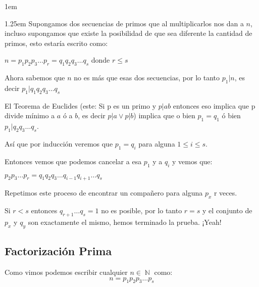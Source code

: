 \documentclass[12pt, fleqn]{report}                             %
\newenvironment{Indentation}[1][0.75em]                         %
    {\begin{adjustwidth}{#1}{}}                                     %
    {\end{adjustwidth}}                                             %
\newenvironment{SmallIndentation}[1][0.75em]                    %
    {\begin{adjustwidth}{#1}{}\begin{footnotesize}}                 %
    {\end{footnotesize}\end{adjustwidth}}                           %
\DeclareMathOperator \Naturals  {\mathbb{N}}                     %
\begin{document}
\begin{SmallIndentation}[1em]
            \begin{Indentation}[1.25em]
                Supongamos dos secuencias de primos que al multiplicarlos nos dan
                a $n$, incluso supongamos que existe la posibilidad de que sea
                diferente la cantidad de primos, esto estaría escrito como:

                $n=p_1p_2p_3\dots p_r = q_1q_2q_3\dots q_s$ donde $r \leq s$

                Ahora sabemos que $n$ no es más que esas dos secuencias, por 
                lo tanto $p_1|n$, es decir $p_1|q_1q_2q_3\dots q_s$

                El Teorema de Euclides (este: Si p es un primo y $p|ab$ entonces
                eso implica que p divide mínimo a $a$ ó a $b$, es decir
                $p|a \lor p|b$) implica que o bien $p_1=q_1$ ó bien
                $p_1|q_2q_3\dots q_s$.

                Así que por inducción veremos que $p_1=q_i$ para alguna
                $1 \leq i \leq s$.

                Entonces vemos que podemos cancelar a esa $p_1$ y a $q_i$ y vemos
                que:

                $p_2p_3\dots p_r = q_1q_2q_3\dots q_{i-1}q_{i+1} \dots q_s$

                Repetimos este proceso de encontrar un compañero para alguna $p_x$
                r veces.

                Si $r < s$ entonces $q_{r+1} \dots q_s = 1$ no es posible,
                por lo tanto $r=s$ y el conjunto de $p_x$ y $q_y$ son exactamente
                el mismo, hemos terminado la prueba. ¡Yeah!



            \end{Indentation}
            
        \end{SmallIndentation}



        \clearpage
        \subsection{Factorización Prima}

            Como vimos podemos escribir cualquier $n \in \Naturals$ como:
            \begin{equation}
                n = p_1 p_2 p_3 \dots p_s
            \end{equation}
\end{document}
